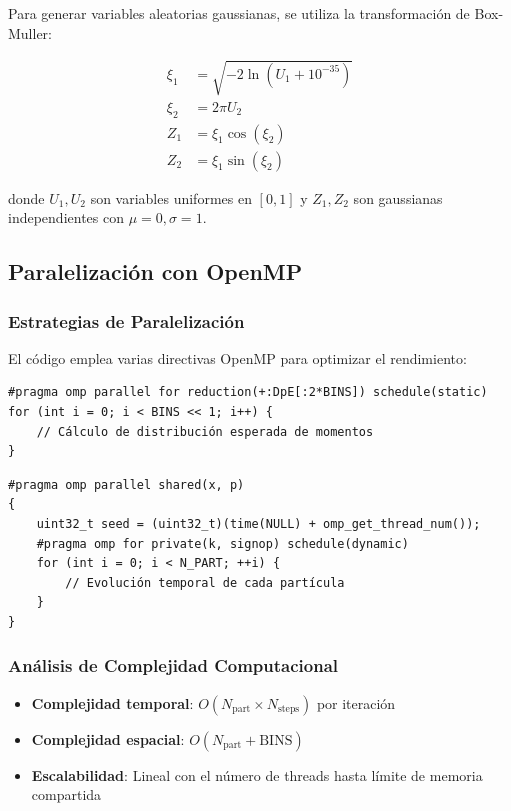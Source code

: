 \documentclass[12pt,a4paper]{article}
\begin{document}
Para generar variables aleatorias gaussianas, se utiliza la transformación de Box-Muller:

\begin{equation}
\begin{aligned}
\xi_1 &= \sqrt{-2\ln(U_1 + 10^{-35})} \\
\xi_2 &= 2\pi U_2 \\
Z_1 &= \xi_1 \cos(\xi_2) \\
Z_2 &= \xi_1 \sin(\xi_2)
\end{aligned}
\end{equation}

donde $U_1, U_2$ son variables uniformes en $[0,1]$ y $Z_1, Z_2$ son gaussianas independientes con $\mu = 0, \sigma = 1$.

\subsection{Paralelización con OpenMP}

\subsubsection{Estrategias de Paralelización}

El código emplea varias directivas OpenMP para optimizar el rendimiento:

\begin{lstlisting}[caption=Paralelización de la inicialización]
#pragma omp parallel for reduction(+:DpE[:2*BINS]) schedule(static)
for (int i = 0; i < BINS << 1; i++) {
    // Cálculo de distribución esperada de momentos
}
\end{lstlisting}

\begin{lstlisting}[caption=Paralelización del bucle principal]
#pragma omp parallel shared(x, p)
{
    uint32_t seed = (uint32_t)(time(NULL) + omp_get_thread_num());
    #pragma omp for private(k, signop) schedule(dynamic)
    for (int i = 0; i < N_PART; ++i) {
        // Evolución temporal de cada partícula
    }
}
\end{lstlisting}

\subsubsection{Análisis de Complejidad Computacional}

\begin{itemize}
    \item \textbf{Complejidad temporal}: $O(N_{\text{part}} \times N_{\text{steps}})$ por iteración
    \item \textbf{Complejidad espacial}: $O(N_{\text{part}} + \text{BINS})$
    \item \textbf{Escalabilidad}: Lineal con el número de threads hasta límite de memoria compartida
\end{itemize}
\end{document}
